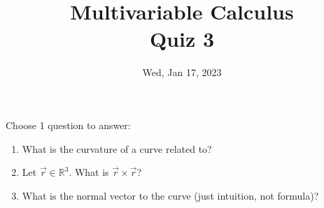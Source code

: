 \documentclass[aspectratio=169]{beamer}
\title{ Multivariable Calculus \\ Quiz 3}
\institute{Fulbright University Vietnam}
\date{Wed, Jan 17, 2023}
\begin{document}
\maketitle

\begin{frame}
    Choose 1 question to answer:
    \begin{enumerate}
        \item What is the curvature of a curve related to?
        \item Let $\vec{r} \in \mathbb{R}^3$. What is $\vec{r} \times \vec{r}$?
        \item What is the normal vector to the curve (just intuition, not formula)?
    \end{enumerate}
\end{frame}
\end{document}
